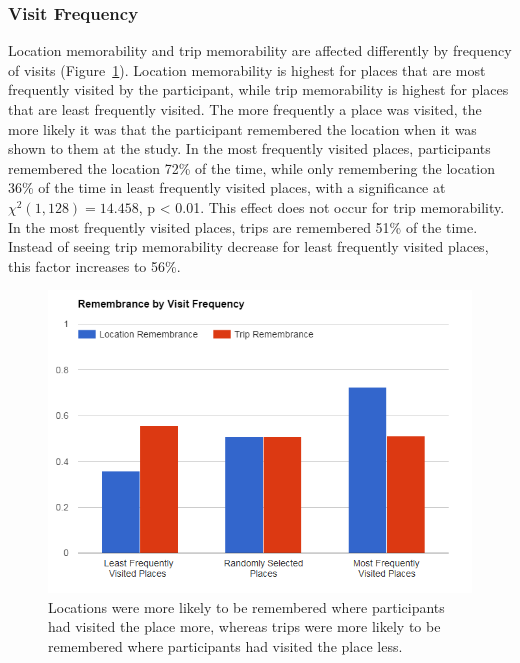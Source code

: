 \documentclass{sigchi}
\begin{document}
\subsubsection{Visit Frequency}
Location memorability and trip memorability are affected differently by frequency of visits (Figure~\ref{fig:frequencymemory}). Location memorability is highest for places that are most frequently visited by the participant, while trip memorability is highest for places that are least frequently visited. The more frequently a place was visited, the more likely it was that the participant remembered the location when it was shown to them at the study. In the most frequently visited places, participants remembered the location 72\% of the time, while only remembering the location 36\% of the time in least frequently visited places, with a significance at $\chi^2(1,128) = 14.458$, p < 0.01. This effect does not occur for trip memorability. In the most frequently visited places, trips are remembered 51\% of the time. Instead of seeing trip memorability decrease for least frequently visited places, this factor increases to 56\%.

\begin{figure}
   \centering
     \includegraphics[width=1\linewidth]{RML_2}
     \caption{Locations were more likely to be remembered where participants had visited the place more, whereas trips were more likely to be remembered where participants had visited the place less.}
     \label{fig:frequencymemory}
\end{figure}
\end{document}
